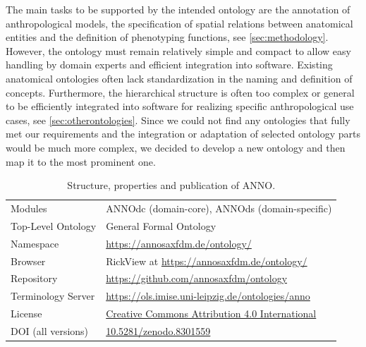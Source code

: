 \documentclass[sw]{iosart2x}
\begin{document}
The main tasks to be supported by the intended ontology are the annotation of anthropological models, the specification of spatial relations between anatomical entities and the definition of phenotyping functions, see \cref{sec:methodology}.
However, the ontology must remain relatively simple and compact to allow easy handling by domain experts and efficient integration into software.
Existing anatomical ontologies often lack standardization in the naming and definition of concepts.
Furthermore, the hierarchical structure is often too complex or general to be efficiently integrated into software for realizing specific anthropological use cases, see \cref{sec:otherontologies}.
Since we could not find any ontologies that fully met our requirements and the integration or adaptation of selected ontology parts would be much more complex, we decided to develop a new ontology and then map it to the most prominent one.

\begin{table}[h]
\centering
\caption{Structure, properties and publication of ANNO.}
\label{tab:publication}
\begin{tabular}{ll}
\toprule
Modules				&ANNOdc (domain-core), ANNOds (domain-specific)\\
Top-Level Ontology	&General Formal Ontology~\citep{gfo}\\
Namespace			&\url{https://annosaxfdm.de/ontology/}\\
Browser				&RickView\tablefootnote{\url{https://github.com/KonradHoeffner/rickview}} at \url{https://annosaxfdm.de/ontology/}\\
Repository			&\url{https://github.com/annosaxfdm/ontology}\\
Terminology Server	&\url{https://ols.imise.uni-leipzig.de/ontologies/anno}\\
License				&\href{https://creativecommons.org/licenses/by/4.0/}{Creative Commons Attribution 4.0 International}\\
DOI (all versions)	&\href{https://doi.org/10.5281/zenodo.8301559}{10.5281/zenodo.8301559}\\
\bottomrule
\end{tabular}
\end{table}
\end{document}
